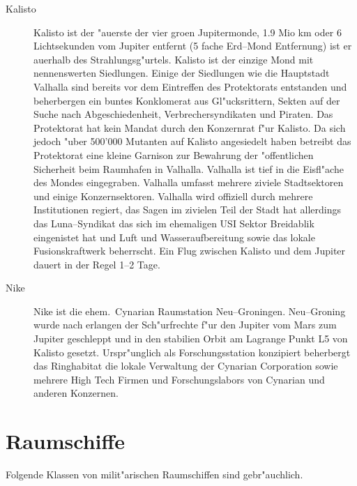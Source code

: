\begin{appendices}
\begin{description}
\item [Kalisto] Kalisto ist der "au\3erste der vier gro\3en Jupitermonde, 1.9 Mio km oder 6 Lichtsekunden vom Jupiter
      entfernt (5 fache Erd--Mond Entfernung) ist er au\3erhalb des Strahlungsg"urtels. Kalisto ist der einzige Mond mit nennenswerten Siedlungen. Einige der Siedlungen wie die Hauptstadt Valhalla sind bereits vor dem Eintreffen des Protektorats entstanden und beherbergen ein buntes Konklomerat aus Gl"ucksrittern, Sekten auf der Suche nach Abgeschiedenheit, Verbrechersyndikaten und Piraten. Das Protektorat hat kein Mandat durch den Konzernrat f"ur Kalisto. Da sich jedoch "uber 500'000 Mutanten auf Kalisto angesiedelt haben betreibt das Protektorat eine kleine Garnison zur Bewahrung der "offentlichen Sicherheit beim Raumhafen in Valhalla. Valhalla ist tief in die Eisfl"ache des Mondes eingegraben. Valhalla umfasst mehrere ziviele Stadtsektoren und einige Konzernsektoren. Valhalla wird offiziell durch mehrere Institutionen regiert, das Sagen im zivielen Teil der Stadt hat allerdings das Luna--Syndikat das sich im ehemaligen USI Sektor Breidablik eingenistet hat und Luft und Wasseraufbereitung sowie das lokale Fusionskraftwerk beherrscht. Ein Flug zwischen Kalisto und dem Jupiter dauert in der Regel 1--2 Tage.
\item [Nike] Nike ist die ehem.~Cynarian Raumstation Neu--Groningen. Neu--Groning wurde nach erlangen der Sch"urfrechte
      f"ur den Jupiter vom Mars zum Jupiter geschleppt und in den stabilien Orbit am Lagrange Punkt L5 von Kalisto gesetzt. Urspr"unglich als Forschungsstation konzipiert beherbergt das Ringhabitat die lokale Verwaltung der Cynarian Corporation sowie mehrere High Tech Firmen und Forschungslabors von Cynarian und anderen Konzernen.
\end{description}

\section{Raumschiffe}

Folgende Klassen von milit"arischen Raumschiffen sind gebr"auchlich.


\end{appendices}
